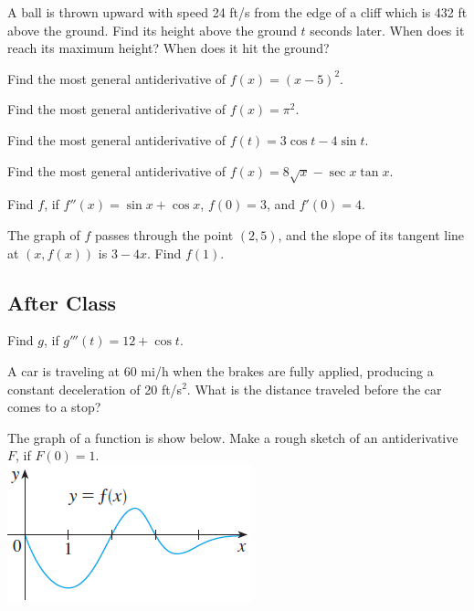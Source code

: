 \documentclass[notes]{subfiles}
\begin{document}
		\begin{ex}
			A ball is thrown upward with speed 24 ft/s from the edge of a cliff which is 432 ft above the ground.  Find its height above the ground $t$ seconds later.  When does it reach its maximum height?  When does it hit the ground?
		\end{ex}
			
		\begin{ex}
			Find the most general antiderivative of $f(x) = (x-5)^2$.
		\end{ex}
			
		\begin{ex}
			Find the most general antiderivative of $f(x) = \pi^2$.
		\end{ex}
	
		\begin{ex}
			Find the most general antiderivative of $f(t) = 3\cos t - 4\sin t$.
		\end{ex}
			\newpage
			
		\begin{ex}
			Find the most general antiderivative of $f(x) = 8\sqrt{x}-\sec x\tan x$.
		\end{ex}
			
		\begin{ex}
			Find $f$, if $f''(x) = \sin x + \cos x$, $f(0) = 3$, and $f'(0)= 4$.
		\end{ex}
		
		\begin{ex}
			The graph of $f$ passes through the point $(2,5)$, and the slope of its tangent line at $(x,f(x))$ is $3-4x$.  Find $f(1)$.
		\end{ex}
			\newpage
			
	\subsection*{After Class}		
		\begin{ex}
			Find $g$, if $g'''(t) = 12+\cos t$.
		\end{ex}
		
		\begin{ex}
			A car is traveling at 60 mi/h when the brakes are fully applied, producing a constant deceleration of 20 ft/s$^2$.  What is the distance traveled before the car comes to a stop?
		\end{ex}	
			
		\begin{ex}
			The graph of a function is show below.  Make a rough sketch of an antiderivative $F$, if $F(0) = 1$.\\
			\includegraphics{3.9fig1}
		\end{ex}
	\clearpage
\end{document}
